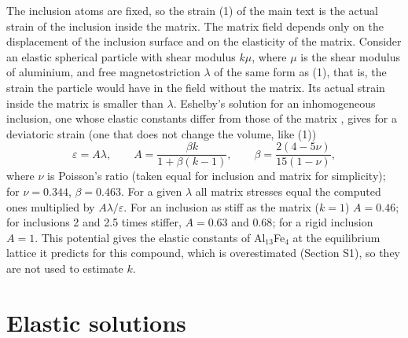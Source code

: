 \documentclass[11pt,a4paper]{article}
\begin{document}
The inclusion atoms are fixed, so the strain (1) of the main text is
the actual strain of the inclusion inside the matrix. The matrix field depends
only on the displacement of the inclusion surface and on the elasticity of the
matrix. Consider an elastic spherical particle with shear modulus $k\mu$,
where $\mu$ is the shear modulus of aluminium, and free magnetostriction
$\lambda$ of the same form as (1), that is, the strain the particle would have
in the field without the matrix. Its actual strain inside the matrix is
smaller than $\lambda$. Eshelby's solution for an inhomogeneous inclusion, one
whose elastic constants differ from those of the matrix
\cite{Eshelby1957,Mura1987}, gives for a deviatoric strain (one that does not
change the volume, like (1))
\begin{equation}
\varepsilon=A\lambda,\qquad A=\frac{\beta k}{1+\beta(k-1)},\qquad
\beta=\frac{2(4-5\nu)}{15(1-\nu)} ,
\end{equation}
where $\nu$ is Poisson's ratio (taken equal for inclusion and matrix for
simplicity); for $\nu=0.344$, $\beta=0.463$. For a given $\lambda$ all matrix
stresses equal the computed ones multiplied by $A\lambda/\varepsilon$. For an
inclusion as stiff as the matrix ($k=1$) $A=0.46$; for inclusions 2 and 2.5 times
stiffer, $A=0.63$ and $0.68$; for a rigid inclusion $A=1$. This
potential gives the elastic constants of Al$_{13}$Fe$_4$ at the equilibrium
lattice it predicts for this compound, which is overestimated (Section S1), so
they are not used to estimate $k$.

\section{Elastic solutions}
\end{document}
